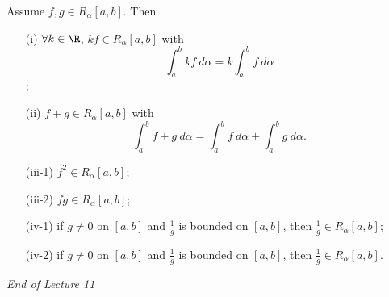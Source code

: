 \begin{theorem}\label{Algebraic properties of R.S integral}
    Assume \( f,g \in {R}_{\alpha}[a,b] \). Then
    \begin{enumerate}
        \item[(i)] \( \forall k \in \R  \), \( kf \in {R}_{\alpha}[a,b] \) with \[ \int_{ a }^{ b }  kf  \ d \alpha = k \int_{ a }^{ b }  f  \ d \alpha \];
        \item[(ii)] \( f + g \in {R}_{\alpha}[a,b] \) with 
            \[  \int_{ a }^{ b }  f + g  \ d \alpha = \int_{ a }^{ b }  f  \ d \alpha  + \int_{ a }^{ b }  g  \ d \alpha. \]
        \item[(iii-1)]  \( f^{2} \in {R}_{\alpha}[a,b] \);
        \item[(iii-2)] \( fg \in {R}_{\alpha}[a,b] \);
        \item[(iv-1)] if \( g \neq 0  \) on \( [a,b] \) and \( \frac{ 1 }{ g }  \) is bounded on \( [a,b] \), then \( \frac{ 1 }{ g }  \in {R}_{\alpha}[a,b] \);
        \item[(iv-2)] if \( g \neq 0  \) on \( [a,b] \) and \( \frac{ 1 }{ g }   \) is bounded on \( [a,b] \), then \( \frac{ 1 }{ g }  \in {R}_{\alpha}[a,b] \).
    \end{enumerate}
\end{theorem}



\begin{center}
    \textit{End of Lecture 11} 
\end{center}
